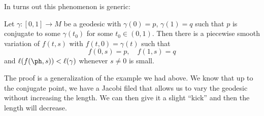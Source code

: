 \documentclass[a4paper]{article}
\begin{document}
In turns out this phenomenon is generic:

\begin{thm}
  Let $\gamma: [0, 1] \to M$ be a geodesic with $\gamma(0) = p$, $\gamma(1) = q$ such that $p$ is conjugate to some $\gamma(t_0)$ for some $t_0 \in (0, 1)$. Then there is a piecewise smooth variation of $f(t, s)$ with $f(t, 0) = \gamma(t)$ such that
  \[
    f(0, s) = p,\quad f(1, s) = q
  \]
  and $\ell(f(\ph, s)) < \ell(\gamma)$ whenever $s \not= 0$ is small.
\end{thm}

The proof is a generalization of the example we had above. We know that up to the conjugate point, we have a Jacobi filed that allows us to vary the geodesic without increasing the length. We can then give it a slight ``kick'' and then the length will decrease.
\end{document}
